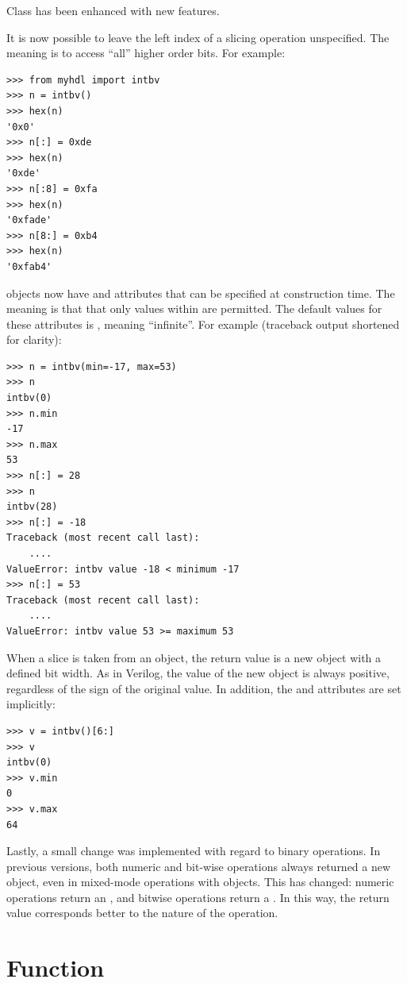 \documentclass{howto}
\begin{document}
Class  has been enhanced with new features.

It is now possible to leave the left index of a slicing operation
unspecified. The meaning is to access ``all'' higher order bits. For
example:

\begin{verbatim}
>>> from myhdl import intbv
>>> n = intbv()
>>> hex(n)
'0x0'
>>> n[:] = 0xde
>>> hex(n)
'0xde'
>>> n[:8] = 0xfa
>>> hex(n)
'0xfade'
>>> n[8:] = 0xb4
>>> hex(n)
'0xfab4'
\end{verbatim}

 objects now have  and  attributes
that can be specified at construction time. The meaning is that that
only values within  are permitted. The default
values for these attributes is , meaning ``infinite''. For
example (traceback output shortened for clarity):

\begin{verbatim}
>>> n = intbv(min=-17, max=53)
>>> n
intbv(0)
>>> n.min
-17
>>> n.max
53
>>> n[:] = 28
>>> n
intbv(28)
>>> n[:] = -18
Traceback (most recent call last):
    ....
ValueError: intbv value -18 < minimum -17
>>> n[:] = 53
Traceback (most recent call last):
    ....
ValueError: intbv value 53 >= maximum 53
\end{verbatim}

When a slice is taken from an  object, the return value
is a new  object with a defined bit width. As in
Verilog, the value of the new  object is always
positive, regardless of the sign of the original value. In addition,
the  and  attributes are set implicitly:

\begin{verbatim}
>>> v = intbv()[6:]
>>> v
intbv(0)
>>> v.min
0
>>> v.max
64
\end{verbatim}

Lastly, a small change was implemented with regard to 
binary operations. In previous versions, both numeric
and bit-wise operations always returned a new 
object, even in mixed-mode operations with 
objects. This has changed: numeric operations 
return an , and bitwise operations return
a . In this way, the return value corresponds
better to the nature of the operation.

\section{Function  \label{section-concat}}
\end{document}
